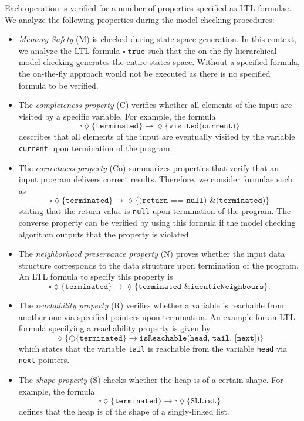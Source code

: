 \documentclass[a4paper, 12pt, twoside]{report}
\begin{document}
	Each operation is verified for a number of properties specified as LTL formulae. We analyze the following properties during the model checking procedures:
	
	\begin{itemize}
		\item \textit{Memory Safety} (M) is checked during state space generation. In this context, we analyze the LTL formula $\square\; \texttt{true}$ such that the on-the-fly hierarchical model checking generates the entire states space. Without a specified formula, the on-the-fly approach would not be executed as there is no specified formula to be verified.
		\item The \textit{completeness property} (C) verifies whether all elements of the input are visited by a specific variable. For example, the formula \[\square \lozenge\texttt{\{terminated\}} \rightarrow \lozenge \texttt{\{visited(current)\}}\] describes that all elements of the input are eventually visited by the variable \texttt{current} upon termination of the program. 
		\item The \textit{correctness property} (Co) summarizes properties that verify that an input program delivers correct results. Therefore, we consider formulae such as \[\square \lozenge\texttt{\{terminated\}} \rightarrow \lozenge\texttt{\{(return == null) \& (terminated)\}}\] stating that the return value is \texttt{null} upon termination of the program. The converse property can be verified by using this formula if the model checking algorithm outputs that the property is violated.
		\item The \textit{neighborhood preservance property} (N) proves whether the input data structure corresponds to the data structure upon termination of the program. An LTL formula to specify this property is \[\square \lozenge\texttt{\{terminated\}} \rightarrow \lozenge \texttt{\{terminated \& identicNeighbours\}}.\]
		\item The \textit{reachability property} (R) verifies whether a variable is reachable from another one via specified pointers upon termination. An example for an LTL formula specifying a reachability property is given by \[\lozenge\{\bigcirc\{\texttt{terminated}\} \rightarrow \texttt{isReachable(head, tail, [next])}\}\] which states that the variable \texttt{tail} is reachable from the variable \texttt{head} via \texttt{next} pointers.
		\item The \textit{shape property} (S) checks whether the heap is of a certain shape. For example, the formula \[\square\lozenge\{\texttt{terminated}\}\rightarrow \square\lozenge\{\texttt{SLList}\}\] defines that the heap is of the shape of a singly-linked list.
	\end{itemize}
	
\end{document}
